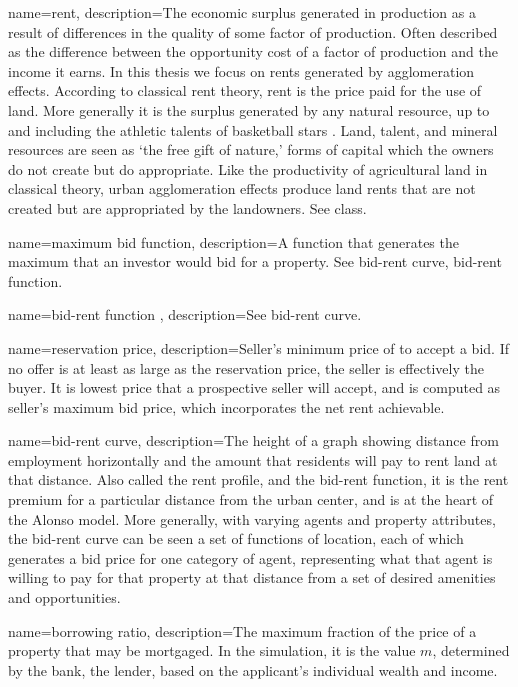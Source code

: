 {
name=rent,
description={The economic  surplus generated in production as a result of differences in the quality of some \gls{factor of production}. Often described as the difference between the opportunity cost of a factor of production and the income it earns. In this thesis we focus on rents generated by \glspl{agglomeration effect}. According to \gls{classical rent theory}, rent is the price paid for the use of land. More generally it is the  surplus generated by any natural resource, up to and including the athletic talents of basketball stars \cite{lackmanClassicalBaseModern1976}. Land, talent, and mineral resources are seen as `the free gift of nature,' forms of capital which the owners do not create but do appropriate. Like the productivity of agricultural land in classical theory,  urban \glspl{agglomeration effect} produce land rents that are not created but are appropriated by the landowners. See \gls{class}.}
}

{
name=maximum bid function,
description={A function that generates the maximum that an investor would bid for a property.  See \gls{bid-rent curve}, \gls{bid-rent function}.}
}

{
name=bid-rent function ,
description={See \gls{bid-rent curve}.}
}

{
name=reservation price,
description={Seller's minimum price of to accept a bid. If no offer is at least as large as the reservation price, the seller is effectively the buyer. It is lowest price that a prospective seller will accept, and is computed as seller's maximum bid price, which incorporates the net rent achievable.}
}

{
name=bid-rent curve,
description={The height of a graph showing distance from employment horizontally and the amount that residents will pay to rent land at that distance. Also called the \gls{rent profile}, and the \gls{bid-rent function}, it is the \gls{rent premium} for a particular distance from the urban center, and is at the heart of the \gls{Alonso model}. More generally, with varying agents and property attributes, the bid-rent curve can be seen a set of functions of location, each of which generates a bid price for one category of agent, representing what that agent is willing to pay for that property at that distance from a set of desired amenities and opportunities.}
}

{
name=borrowing ratio,
description={The maximum fraction of the price of a property that may be mortgaged. In the simulation, it is the value $m$, determined by the bank, the lender, based on the applicant's individual \gls{wealth} and income.} 
}

